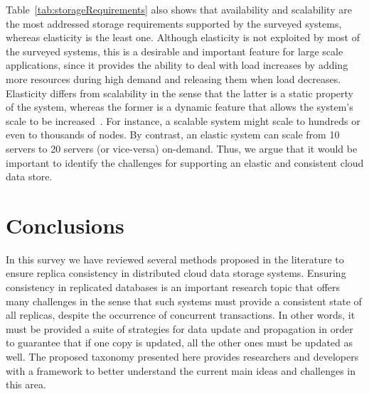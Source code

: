 Table~\ref{tab:storageRequirements} also shows that availability and scalability are the most addressed storage requirements supported by the surveyed systems, whereas elasticity is the least one. Although elasticity is not exploited by most of the surveyed systems, this is a desirable and important feature for large scale applications, 
since it provides the ability to deal with load increases by adding more resources during high demand and releasing them when load decreases. Elasticity differs from scalability in the sense that the latter is a static property of the system, whereas the former is a dynamic feature that allows the system’s scale to be increased~\cite{agrawal2011database}. For instance, a scalable system might scale to hundreds or even to thousands of nodes. By contrast, an elastic system can scale from 10 servers to 20 servers (or vice-versa) on-demand.
Thus, we argue that it would be important to identify the challenges for supporting an elastic and consistent cloud data store.

\section{Conclusions}
\label{sec:conclusions}

In this survey we have reviewed several methods 
proposed in the literature to ensure replica consistency in distributed cloud data storage systems. 
Ensuring consistency in replicated databases is an important research topic that offers many challenges in the sense that such systems must provide a consistent state of all replicas, despite the occurrence of concurrent transactions. In other words, it must be provided a suite of strategies for data update and propagation in order to guarantee that if one copy is updated, all the other ones must be updated as well. 
The proposed taxonomy presented 
here provides researchers and developers with a framework to better understand the current main ideas and challenges in this area.

